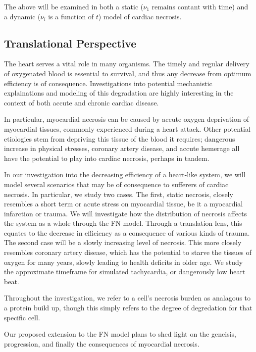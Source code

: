 \documentclass[11pt]{article}
\begin{document}
The above will be examined in both a static ($\nu_1$ remains contant with time) and a dynamic ($\nu_i$ is a function of $t$) model of cardiac necrosis. 

\subsection{Translational Perspective} %

The heart serves a vital role in many organisms. The timely and regular delivery of oxygenated blood is essential to survival, and thus any decrease from optimum efficiency is of consequence. Investigations into potential mechanistic explainations and modeling of this degradation are highly interesting in the context of both accute and chronic cardiac disease.

In particular, myocardial necrosis can be caused by accute oxygen deprivation of myocardial tissues, commonly experienced during a heart attack. Other potential etiologies stem from depriving this tissue of the blood it requires; dangerous increase in physical stresses, coronary artery disease, and accute hemerage all have the potential to play into cardiac necrosis, perhaps in tandem. 

In our investigation into the decreasing efficiency of a heart-like system, we will model several scenarios that may be of consequence to sufferers of cardiac necrosis. In particular, we study two cases. The first, static necrosis, closely resembles a short term or acute stress on myocardial tissue, be it a myocardial infarction or trauma. We will investigate how the distribution of necrosis affects the system as a whole through the FN model. Through a translation lens, this equates to the decrease in efficiency as a consequence of various kinds of trauma. The second case will be a slowly increasing level of necrosis. This more closely resembles coronary artery disease, which has the potential to starve the tissues of oxygen for many years, slowly leading to health deficits in older age. We study the approximate timeframe for simulated tachycardia, or dangerously low heart beat. 

Throughout the investigation, we refer to a cell's necrosis burden as analagous to a protein build up, though this simply refers to the degree of degredation for that specific cell.

Our proposed extension to the FN model plans to shed light on the geneisis, progression, and finally the consequences of myocardial necrosis. 
\end{document}
